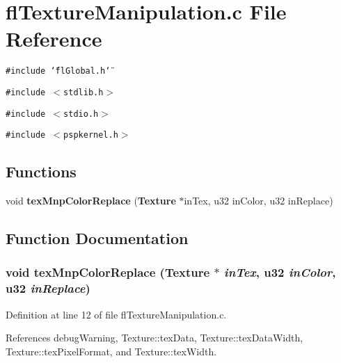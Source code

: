 \section{fl\-Texture\-Manipulation.c File Reference}
\label{flTextureManipulation_8c}
{\tt \#include \char`\"{}fl\-Global.h\char`\"{}}\par
{\tt \#include $<$stdlib.h$>$}\par
{\tt \#include $<$stdio.h$>$}\par
{\tt \#include $<$pspkernel.h$>$}\par
\subsection*{Functions}
\begin{CompactItemize}
\item 
void {\bf tex\-Mnp\-Color\-Replace} ({\bf Texture} $\ast$in\-Tex, u32 in\-Color, u32 in\-Replace)
\end{CompactItemize}


\subsection{Function Documentation}
\subsubsection{\setlength{\rightskip}{0pt plus 5cm}void tex\-Mnp\-Color\-Replace ({\bf Texture} $\ast$ {\em in\-Tex}, u32 {\em in\-Color}, u32 {\em in\-Replace})}\label{flTextureManipulation_8c_6c5c446927e8bb7d66c6fadf42fc53f2}




Definition at line 12 of file fl\-Texture\-Manipulation.c.

References debug\-Warning, Texture::tex\-Data, Texture::tex\-Data\-Width, Texture::tex\-Pixel\-Format, and Texture::tex\-Width.